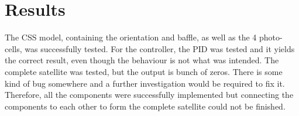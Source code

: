 \section{Results}
\label{sec:results}

The CSS model, containing the orientation and baffle, as well as the 4 photo-cells, was successfully tested. For the controller, the PID was tested and it yields the correct result, even though the behaviour is not what was intended. The complete satellite was tested, but the output is bunch of zeros. There is some kind of bug somewhere and a further investigation would be required to fix it. Therefore, all the components were successfully implemented but connecting the components to each other to form the complete satellite could not be finished. 


